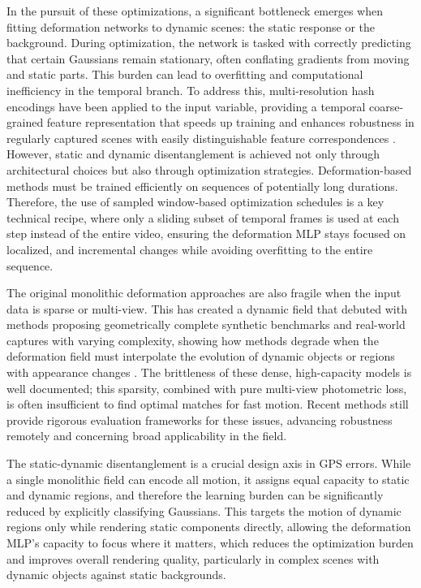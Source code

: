 \documentclass[11pt,a4paper]{article}
\begin{document}
In the pursuit of these optimizations, a significant bottleneck emerges when fitting deformation networks to dynamic scenes: the static response or the background. During optimization, the network is tasked with correctly predicting that certain Gaussians remain stationary, often conflating gradients from moving and static parts. This burden can lead to overfitting and computational inefficiency in the temporal branch. To address this, multi-resolution hash encodings have been applied to the input variable, providing a temporal coarse-grained feature representation that speeds up training and enhances robustness in regularly captured scenes with easily distinguishable feature correspondences \cite{arxiv:2410.20815v3}. However, static and dynamic disentanglement is achieved not only through architectural choices but also through optimization strategies. Deformation-based methods must be trained efficiently on sequences of potentially long durations. Therefore, the use of sampled window-based optimization schedules is a key technical recipe, where only a sliding subset of temporal frames is used at each step instead of the entire video, ensuring the deformation MLP stays focused on localized, and incremental changes while avoiding overfitting to the entire sequence.

The original monolithic deformation approaches are also fragile when the input data is sparse or multi-view. This has created a dynamic field that debuted with methods proposing geometrically complete synthetic benchmarks and real-world captures with varying complexity, showing how methods degrade when the deformation field must interpolate the evolution of dynamic objects or regions with appearance changes \cite{arxiv:2412.20720v2}. The brittleness of these dense, high-capacity models is well documented; this sparsity, combined with pure multi-view photometric loss, is often insufficient to find optimal matches for fast motion. Recent methods still provide rigorous evaluation frameworks for these issues, advancing robustness remotely and concerning broad applicability in the field.

The static-dynamic disentanglement is a crucial design axis in GPS errors. While a single monolithic field can encode all motion, it assigns equal capacity to static and dynamic regions, and therefore the learning burden can be significantly reduced by explicitly classifying Gaussians. This targets the motion of dynamic regions only while rendering static components directly, allowing the deformation MLP's capacity to focus where it matters, which reduces the optimization burden and improves overall rendering quality, particularly in complex scenes with dynamic objects against static backgrounds.
\end{document}
